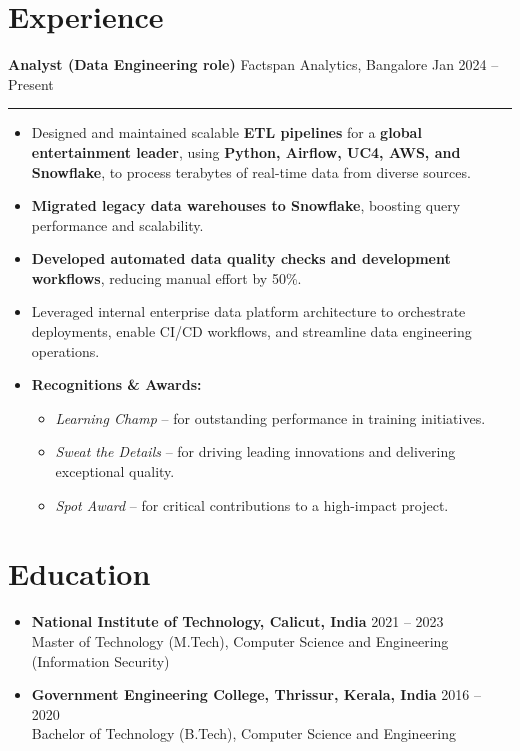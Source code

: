 \documentclass[11pt,a4paper]{article}
\begin{document}
\section*{Experience}
\textbf{Analyst (Data Engineering role)} \hfill Factspan Analytics, Bangalore \hfill Jan 2024 – Present\vspace{0.2cm}
\hrule
\vspace{0.2cm}
\begin{itemize}
    \item Designed and maintained scalable \textbf{ETL pipelines} for a \textbf{global entertainment leader}, using \textbf{Python, Airflow, UC4, AWS, and Snowflake}, to process terabytes of real-time data from diverse sources.
    \item \textbf{Migrated legacy data warehouses to Snowflake}, boosting query performance and scalability.
    \item \textbf{Developed automated data quality checks and development workflows}, reducing manual effort by 50\%.
    \item Leveraged internal enterprise data platform architecture to orchestrate deployments, enable CI/CD workflows, and streamline data engineering operations.
    \item \textbf{Recognitions \& Awards:}
    \begin{itemize}
        \item \textit{Learning Champ} – for outstanding performance in training initiatives.
        \item \textit{Sweat the Details} – for driving leading innovations and delivering exceptional quality.
        \item \textit{Spot Award} – for critical contributions to a high-impact project.
    \end{itemize}
\end{itemize}

\section*{Education}
\begin{itemize}[leftmargin=0.5cm]
    \item \textbf{National Institute of Technology, Calicut, India} \hfill 2021 -- 2023 \\
          Master of Technology (M.Tech), Computer Science and Engineering (Information Security)
    \item \textbf{Government Engineering College, Thrissur, Kerala, India} \hfill 2016 -- 2020 \\
          Bachelor of Technology (B.Tech), Computer Science and Engineering
\end{itemize}
\end{document}

